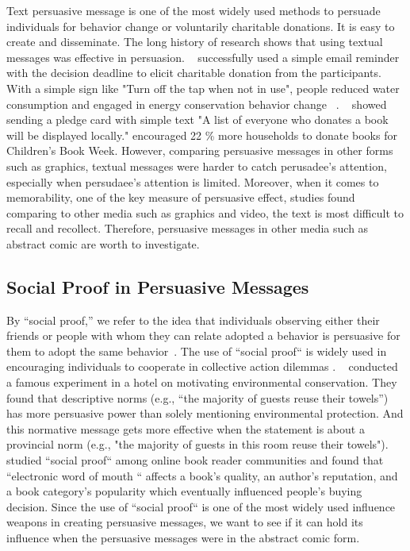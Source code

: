Text persuasive message is one of the most widely used methods to persuade individuals for behavior change or voluntarily charitable donations. It is easy to create and disseminate. The long history of research shows that using textual messages was effective in persuasion. ~\textcite{damgaard2017now} successfully used a simple email reminder with the decision deadline to elicit charitable donation from the participants. With a simple sign like "Turn off the tap when not in use", people reduced water consumption and engaged in energy conservation behavior change ~\cite{mckenzie2011fostering}. ~\textcite{cotterill2010impact} showed sending a pledge card with simple text "A list of everyone who donates a book will be displayed locally." encouraged 22 \% more households to donate books for Children's Book Week. However, comparing persuasive messages in other forms such as graphics, textual messages were harder to catch perusadee's attention, especially when persudaee's attention is limited. Moreover, when it comes to memorability, one of the key measure of persuasive effect, studies found comparing to other media such as graphics and video, the text is most difficult to recall and recollect. Therefore, persuasive messages in other media such as abstract comic are worth to investigate. 


\subsection{Social Proof in Persuasive Messages }
By ``social proof,'' we refer to the idea that individuals observing either their friends or people with whom they can relate adopted a behavior is persuasive for them to adopt the same behavior~\cite{Cialdini1993, Cialdini2004}. The use of ``social proof`` is widely used in encouraging individuals to cooperate in collective action dilemmas \cite{goldstein2008room,schultz2007constructive}. ~\textcite{goldstein2008room} conducted a famous experiment in a hotel on motivating environmental conservation. They found that descriptive norms (e.g., ``the majority of guests reuse their towels'') has more persuasive power than solely mentioning environmental protection. And this normative message gets more effective when the statement is about a provincial norm (e.g., "the majority of guests in this room reuse their towels"). \textcite{amblee2011harnessing} studied ``social proof`` among online book reader communities and found that 
``electronic word of mouth `` affects a book's quality, an author's reputation, and a book category's popularity which eventually influenced people's buying decision.  Since the use of ``social proof`` is one of the most widely used influence weapons in creating persuasive messages, we want to see if it can hold its influence when the persuasive messages were in the abstract comic form. 


